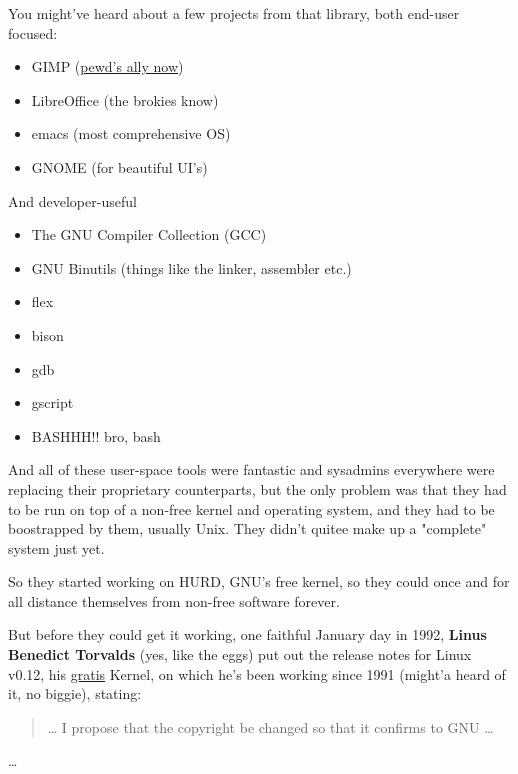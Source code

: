 \documentclass[sigplan,screen]{acmart}
\begin{document}
You might've heard about a few projects from that library, both end-user focused:
\begin{itemize}
	\item GIMP (\href{https://www.youtube.com/watch?v=pVI_smLgTY0}{pewd's ally now}) \cite{pewds-linux}
	\item LibreOffice (the brokies know)
	\item emacs (most comprehensive OS)
	\item GNOME (for beautiful UI's)\cite{gnome}
\end{itemize}
And developer-useful
\begin{itemize}
	\item The GNU Compiler Collection (GCC)
	\item GNU Binutils (things like the linker, assembler etc.)
	\item flex
	\item bison
	\item gdb
	\item gscript
	\item BASHHH!! bro, bash
\end{itemize}
And all of these user-space tools were fantastic and sysadmins everywhere were replacing their proprietary counterparts, but the only problem was that they had to be run on top of a non-free kernel and operating system, and they had to be boostrapped by them, usually Unix. They didn't quitee make up a "complete" system just yet.

So they started working on HURD, GNU's free kernel, so they could once and for all distance themselves from non-free software forever. \cite{hurd}

But before they could get it working, one faithful January day in 1992, \textbf{Linus Benedict Torvalds} (yes, like the eggs) put out the release notes for Linux v0.12, his \href{https://www.gnu.org/philosophy/words-to-avoid.en.html#Freemium}{gratis} Kernel, on which he's been working since 1991 (might'a heard of it, no biggie)\cite{linux-init-release-note}, stating:
\begin{quote}
	… I propose that the
	copyright be changed so that it confirms to GNU …
\end{quote}\cite{linux-becomes-free}

\ldots
\end{document}
